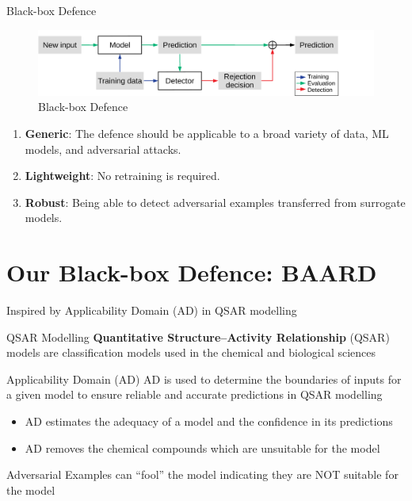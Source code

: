 \documentclass[9pt]{beamer}
\begin{document}
\begin{frame}{Black-box Defence}
\begin{figure}[h!]
    \centering
    \scriptsize
    \includegraphics[width=\linewidth]{images/black-box-defence.pdf}
    \caption{Black-box Defence}
\end{figure}

\begin{enumerate}
    \item \textbf{Generic}: The defence should be applicable to a broad variety of data, ML models, and adversarial attacks.
    \item \textbf{Lightweight}: No retraining is required.
    \item \textbf{Robust}: Being able to detect adversarial examples transferred from surrogate models.
\end{enumerate}

\hyperlink{defence}{}
\end{frame}

\section{Our Black-box Defence: BAARD}
\begin{frame}{Inspired by Applicability Domain (AD) in QSAR modelling}
\label{ad}

\begin{block}{QSAR Modelling}
\textbf{Quantitative Structure–Activity Relationship} (QSAR) models are classification models used in the chemical and biological sciences
\end{block}

\begin{block}{Applicability Domain (AD)}
AD is used to determine the boundaries of inputs for a given model to ensure reliable and accurate predictions in QSAR modelling

\begin{itemize}
    \item AD estimates the adequacy of a model and the confidence in its predictions
    \item AD removes the chemical compounds which are unsuitable for the model
\end{itemize}
\end{block}

Adversarial Examples can ``fool'' the model indicating they are NOT suitable for the model

\hyperlink{decision_boundary}{}
\end{frame}
\end{document}
